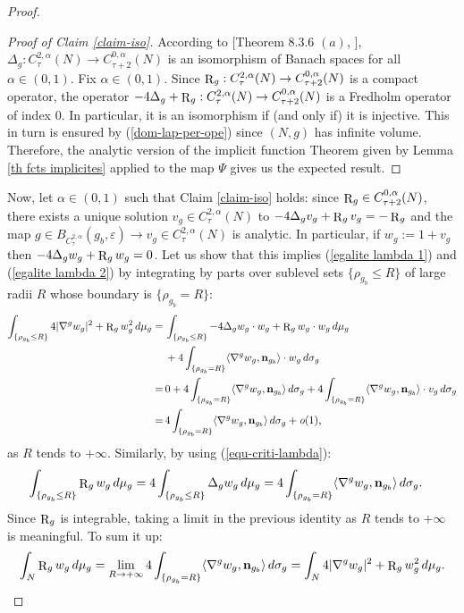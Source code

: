 \documentclass[a4paper,11pt,reqno]{amsart}
\def\R{\mathop{\rm R}\nolimits}
\numberwithin{equation}{section}
\begin{document}
\begin{proof}
\begin{proof}[Proof of Claim \ref{claim-iso}]
			According to [Theorem $8.3.6$ $(a)$, \cite{Joy-Book}], $\Delta_g: C^{2,\alpha}_{\tau}(N)\rightarrow C^{0,\alpha}_{\tau+2}(N)$ is an isomorphism of Banach spaces for all $\alpha\in(0,1)$. Fix $\alpha\in(0,1)$. Since $\R_g: C^{2,\alpha}_{\tau}(N)\rightarrow C^{0,\alpha}_{\tau+2}(N)$ is a compact operator, the operator $-4\Delta_g+\R_g: C^{2,\alpha}_{\tau}(N)\rightarrow C^{0,\alpha}_{\tau+2}(N)$ is a Fredholm operator of index $0$. In particular, it is an isomorphism if (and only if) it is injective. This in turn is ensured by (\ref{dom-lap-per-ope}) since $(N,g)$ has infinite volume.
			Therefore, the analytic version of the implicit function Theorem given by Lemma \ref{th fcts implicites} applied to the map $\Psi$ gives us the expected result.
		\end{proof}
		Now, let $\alpha\in(0,1)$ such that Claim \ref{claim-iso} holds: since $\R_g\in C^{0,\alpha}_{\tau+2}(N)$, there exists a unique solution $v_g\in C^{2,\alpha}_{\tau}(N)$ to $-4\Delta_gv_g+\R_gv_g=-\R_g$ and the map $g\in B_{C^{2,\alpha}_{\tau}}(g_b,\varepsilon)\rightarrow v_g\in C^{2,\alpha}_{\tau}(N)$ is analytic. In particular, if $w_g:=1+v_g$ then $-4\Delta_gw_g+\R_gw_g=0$. Let us show that this implies (\ref{egalite lambda 1}) and (\ref{egalite lambda 2}) by integrating by parts over sublevel sets $\{\rho_{g_b}\leq R\}$ of large radii $R$ whose boundary is $\{\rho_{g_b}= R\}$:
		\begin{equation*}
		\begin{split}
		\int_{\{\rho_{g_b}\leq R\}}4|\nabla^gw_g|^2+\R_gw_g^2\,d\mu_g=\,&\int_{\{\rho_{g_b}\leq R\}}-4\Delta_gw_g\cdot w_g+\R_gw_g\cdot w_g\,d\mu_g\\
		&+4\int_{\{\rho_{g_b}= R\}}\langle\nabla^gw_g,\mathbf{n}_{g_b}\rangle \cdot w_g\,d\sigma_g\\
		=\,&0+4\int_{\{\rho_{g_b}= R\}}\langle\nabla^gw_g,\mathbf{n}_{g_b}\rangle\, d\sigma_g +4\int_{\{\rho_{g_b}= R\}}\langle\nabla^gw_g,\mathbf{n}_{g_b}\rangle \cdot v_g\,d\sigma_g\\
		=\,&4\int_{\{\rho_{g_b}= R\}}\langle\nabla^gw_g,\mathbf{n}_{g_b}\rangle\,d\sigma_g+\textit{o}(1),
		\end{split}
		\end{equation*}
		as $R$ tends to $+\infty$. Similarly, by using (\ref{equ-criti-lambda}):
		\begin{equation*}
		\begin{split}
		\int_{\{\rho_{g_b}\leq R\}}\R_gw_g\,d\mu_g&=4\int_{\{\rho_{g_b}\leq R\}}\Delta_gw_g\,d\mu_g=4\int_{\{\rho_{g_b}= R\}}\langle\nabla^gw_g,\mathbf{n}_{g_b}\rangle \,d\sigma_g.
		\end{split}
		\end{equation*}
		Since $\R_g$ is integrable, taking a limit in the previous identity as $R$ tends to $+\infty$ is meaningful. To sum it up:
		\begin{equation}
		\int_{N}\R_gw_g\,d\mu_g=\lim_{R\rightarrow+\infty}4\int_{\{\rho_{g_b}= R\}}\langle\nabla^gw_g,\mathbf{n}_{g_b}\rangle \,d\sigma_g=\int_{N}4|\nabla^gw_g|^2+\R_gw_g^2\,d\mu_g.\label{equ-diff-form-lambda}
		\end{equation}
		

\end{proof}
\end{document}
